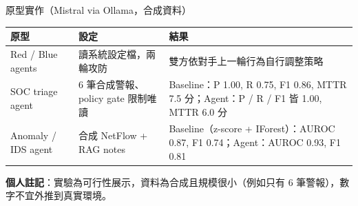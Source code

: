 \documentclass[aspectratio=169]{beamer}
\newcommand{\tabsetup}{\renewcommand{\arraystretch}{1.18}}
\begin{document}
\begin{frame}{原型實作（Mistral via Ollama，合成資料）}
    \tabsetup
    \footnotesize
    \begin{table}
        \centering
        \begin{tabular}{@{}l p{3.2cm} p{5.4cm}@{}}
            \toprule
            原型 & 設定 & 結果 \\
            \midrule
            Red / Blue agents & 讀系統設定檔，兩輪攻防 & 雙方依對手上一輪行為自行調整策略 \\
            SOC triage agent & 6 筆合成警報、policy gate 限制唯讀 & Baseline：P 1.00, R 0.75, F1 0.86, MTTR 7.5 分；Agent：P / R / F1 皆 1.00, MTTR 6.0 分 \\
            Anomaly / IDS agent & 合成 NetFlow + RAG notes & Baseline（z-score + IForest）：AUROC 0.87, F1 0.74；Agent：AUROC 0.93, F1 0.81 \\
            \bottomrule
        \end{tabular}
    \end{table}

    \small
    \textbf{個人註記}：實驗為可行性展示，資料為合成且規模很小（例如只有 6 筆警報），數字不宜外推到真實環境。
\end{frame}
\end{document}
